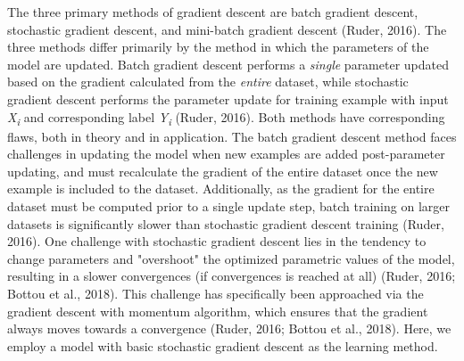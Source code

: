 \documentclass[11pt]{article}
\begin{document}
The three primary methods of gradient descent are batch gradient descent, stochastic gradient descent, and mini-batch gradient descent (Ruder, 2016). The three methods differ primarily by the method in which the parameters of the model are updated. Batch gradient descent performs a \textit{single} parameter updated based on the gradient calculated from the \textit{entire} dataset, while stochastic gradient descent performs the parameter update for training example with input \textit{X\textsubscript{i}} and corresponding label \textit{Y\textsubscript{i}} (Ruder, 2016). Both methods have corresponding flaws, both in theory and in application. The batch gradient descent method faces challenges in updating the model when new examples are added post-parameter updating, and must recalculate the gradient of the entire dataset once the new example is included to the dataset. Additionally, as the gradient for the entire dataset must be computed prior to a single update step, batch training on larger datasets is significantly slower than stochastic gradient descent training (Ruder, 2016). One challenge with stochastic gradient descent lies in the tendency to change parameters and "overshoot" the optimized parametric values of the model, resulting in a slower convergences (if convergences is reached at all) (Ruder, 2016; Bottou et al., 2018). This challenge has specifically been approached via the gradient descent with momentum algorithm, which ensures that the gradient always moves towards a convergence (Ruder, 2016; Bottou et al., 2018). Here, we employ a model with basic stochastic gradient descent as the learning method.\par
\end{document}

